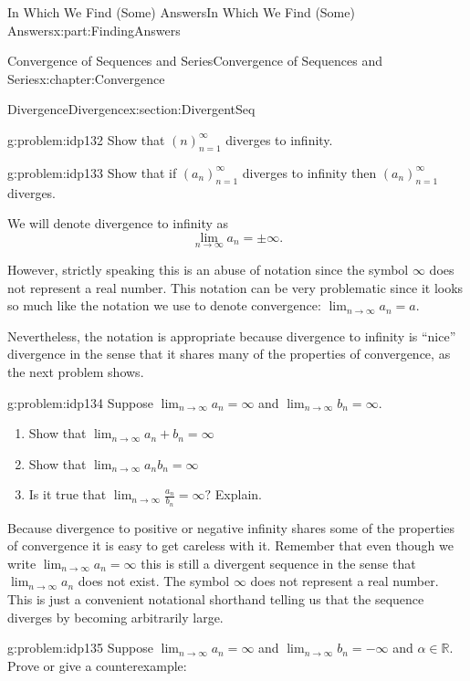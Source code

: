 \documentclass[oneside,10pt,]{book}
\numberwithin{equation}{section}
\def\limit#1#2#3{{\displaystyle\lim_{#1\rightarrow #2}#3}}
\newcommand{\RR}{\mathbb {R}}
\begin{document}
\begin{partptx}{In Which We Find (Some) Answers}{}{In Which We Find (Some) Answers}{}{}{x:part:FindingAnswers}
\begin{chapterptx}{Convergence of Sequences and Series}{}{Convergence of Sequences and Series}{}{}{x:chapter:Convergence}
\begin{sectionptx}{Divergence}{}{Divergence}{}{}{x:section:DivergentSeq}
\begin{problem}{}{g:problem:idp132}%
 Show that \(\left(n\right)_{n=1}^\infty\) diverges to infinity.%
\end{problem}
\begin{problem}{}{g:problem:idp133}%
 Show that if \(\left(a_n\right)_{n=1}^\infty\) diverges to infinity then \(\left(a_n\right)_{n=1}^\infty\) diverges.%
\end{problem}
We will denote divergence to infinity as%
\begin{equation*}
\limit{n}{\infty}{a_n}=\pm\infty\text{.}
\end{equation*}
%
\par
However, strictly speaking this is an abuse of notation since the symbol \(\infty\) does not represent a real number. This notation can be very problematic since it looks so much like the notation we use to denote convergence: \(\limit{n}{\infty}{a_n}=a\).%
\par
Nevertheless, the notation is appropriate because divergence to infinity is ``nice'' divergence in the sense that it shares many of the properties of convergence, as the next problem shows.%
\begin{problem}{}{g:problem:idp134}%
Suppose \(\limit{n}{\infty}{a_n}=\infty\) and \(\limit{n}{\infty}{b_n}=\infty\).%
\begin{enumerate}[font=\bfseries,label=(\alph*),ref=\alph*]
\item{}Show that \(\limit{n}{\infty}{a_n+b_n}=\infty\)%
\item{}Show that \(\limit{n}{\infty}{a_nb_n}=\infty\)%
\item{}Is it true that \(\limit{n}{\infty}{\frac{a_n}{b_n}}=\infty?\) Explain.%
\end{enumerate}
\end{problem}
Because divergence to positive or negative infinity shares some of the properties of convergence it is easy to get careless with it.  Remember that even though we write \(\limit{n}{\infty}{a_n}=\infty\) this is still a divergent sequence in the sense that \(\limit{n}{\infty}{a_n}\) does not exist.  The symbol \(\infty\) does not represent a real number.  This is just a convenient notational shorthand telling us that the sequence diverges by becoming arbitrarily large.%
\begin{problem}{}{g:problem:idp135}%
Suppose \(\limit{n}{\infty}{a_n}=\infty\) and \(\limit{n}{\infty}{b_n}=-\infty\) and \(\alpha\in\RR\).  Prove or give a counterexample:%

\end{problem}
\end{sectionptx}
\end{chapterptx}
\end{partptx}
\end{document}
